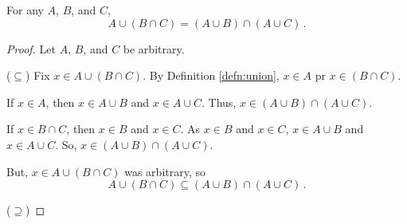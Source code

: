 \guard





\begin{prop}
\label{prop:unionDistributionOverIntersection}
  For any $A$, $B$, and $C$, \[ A\cup( B\cap C) = (A\cup B) \cap (A\cup C)\,. \]
\end{prop}
\begin{proof}
  Let $A$, $B$, and $C$ be arbitrary.

  ($\subseteq$) Fix $x\in A\cup( B\cap C)$.
    By Definition \ref{defn:union},  $x\in A$ pr $x\in(B\cap C)$.

    If $x\in A$, then $x\in A\cup B$ and $x\in A\cup C$.
    Thus, $x\in (A\cup B) \cap (A\cup C)$.

    If $x\in B\cap C$, then $x\in B$ and $x\in C$.
    As $x\in B$ and $x\in C$, $x\in A\cup B$ and $x\in A\cup C$.
    So, $x\in (A\cup B) \cap (A\cup C)$.

    But, $x\in  A\cup( B\cap C)$ was arbitrary, so \[ A\cup( B\cap C) \subseteq (A\cup B) \cap (A\cup C)\,.\]

  ($\supseteq$)
\end{proof}
